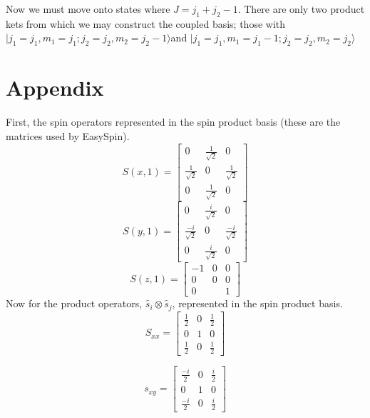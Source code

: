 \documentclass[12pt]{article}
\begin{document}
\noindent Now we must move onto states where $J= j_{1}+j_{2}-1$. There are only two product kets from which we may construct the
coupled basis; those with $| j_{1}=j_{1}, m_{1}=j_{1}; j_{2}=j_{2}, m_{2} = j_{2}-1\rangle $and  
$| j_{1}=j_{1}, m_{1}=j_{1}-1; j_{2}=j_{2}, m_{2} = j_{2}\rangle$

\section{Appendix}
First, the  spin operators represented in the spin product basis (these are the matrices
used by EasySpin).
\begin{equation}
S(x,1) = 
\begin{bmatrix}
0                  & \frac{1}{\sqrt{2}} & 0\\
\frac{1}{\sqrt{2}} & 0                 & \frac{1}{\sqrt{2}} \\ 
0                  & \frac{1}{\sqrt{2}} & 0
\end{bmatrix}
\end{equation}
\begin{equation}
S(y,1) = 
\begin{bmatrix}
0                  & \frac{i}{\sqrt{2}} & 0\\
\frac{-i}{\sqrt{2}} & 0                 & \frac{-i}{\sqrt{2}} \\ 
0                  & \frac{i}{\sqrt{2}} & 0
\end{bmatrix}
\end{equation}
\begin{equation}
S(z,1) = 
\begin{bmatrix}
-1                  & 0 & 0\\
0 & 0               & 0    \\ 
0                   &   & 1
\end{bmatrix}
\end{equation}
Now for the product operators, $\hat{s}_{i}\otimes\hat{s}_{j}$, represented in the
spin product basis.
\begin{equation}
S_{xx} = 
\begin{bmatrix}
\frac{1}{2} & 0  & \frac{1}{2} \\ 
0           & 1 & 0\\
\frac{1}{2} & 0  & \frac{1}{2} 
\end{bmatrix}
\end{equation}

\begin{equation}
s_{xy} = 
\begin{bmatrix}
\frac{-i}{2} & 0  & \frac{i}{2} \\ 
0           & 1 & 0\\
\frac{-i}{2} & 0  & \frac{i}{2} 
\end{bmatrix}
\end{equation}
\end{document}
